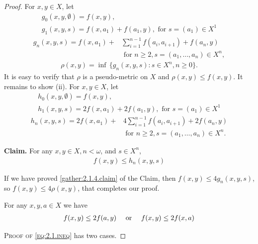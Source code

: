 \documentclass[main.tex]{subfiles}
\begin{document}
\begin{proof} 
For $x, y\in X$, let
\begin{gather}
	g_0(x,y,\emptyset) = f(x,y), \\
	g_1(x,y,s) = f(x,a_1) + f(a_1,y), \text{ for } s = (a_1) \in X^1
\end{gather}
\begin{equation}
	\begin{aligned}
	g_n(x,y,s) =  f(x,a_1) + &\sum_{i=1}^{n-1} f(a_i, a_{i+1}) + f(a_n,y) \\
                                           & \text{ for }  n \ge 2, s = (a_1, \ldots, a_n) \in X^n,
	\end{aligned}
\end{equation}
\begin{gather}
	\rho(x,y) = \inf \,\{ g_n(x,y,s): s \in X^n, n \ge 0 \}.
\end{gather}
It is easy to verify that $\rho$ is a pseudo-metric on $X$ and $\rho(x,y) \le f(x,y)$. It remains to show (ii). For $x, y \in X$, let 
\begin{gather}
	h_0(x,y,\emptyset) = f(x,y), \\
    h_1(x,y,s) = 2f(x,a_1) +2f(a_1,y), \text{ for } s = (a_1) \in X^1
\end{gather}
\begin{equation}
	\begin{aligned}
      h_n(x,y,s) = 2f(x,a_1) + & 4 \sum_{i=1}^{n-1} f(a_i, a_{i+1}) + 2f(a_n,y) \\
                       & \text{ for }  n \ge 2, s = (a_1, \ldots, a_n) \in X^n. 
	\end{aligned}
\end{equation}	

\textbf{Claim.}  For any $x, y \in X, n <\omega$, and $s \in X^n$,
\begin{gather}
f(x,y) \le h_n(x,y,s) 
\label{gather:2.1.4.claim}
\end{gather}

\noindent If we have proved \eqref{gather:2.1.4.claim} of the Claim, then $f(x,y) \le 4g_n(x,y,s)$, so $f(x,y) \le 4\rho(x,y)$, that completes our proof.

For any $x, y, a \in X$ we have 
\begin{gather}
	f(x, y) \le 2 f(a, y) \quad \textup{ or }\quad f(x, y) \le 2 f(x, a)  \label{eq:2.1.ineq}
\end{gather}

\noindent\textsc{Proof of \eqref{eq:2.1.ineq}} has two cases.


\end{proof}
\end{document}
